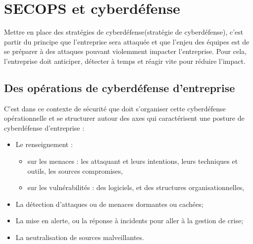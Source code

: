 %
%



\section{SECOPS et cyberdéfense}

Mettre en place des stratégies de cyberdéfense\index(stratégie de cyberdéfense), c'est partir du principe que l'entreprise sera attaquée et que l'enjeu des équipes est de se préparer à des attaques pouvant violemment impacter l'entreprise. Pour cela, l'entreprise doit anticiper, détecter à temps et réagir vite pour réduire l'impact.

	\subsection{Des opérations de cyberdéfense d'entreprise}
	
C'est dans ce contexte de sécurité  que doit s'organiser cette cyberdéfense opérationnelle et se structurer autour des axes qui caractérisent une posture de cyberdéfense d'entreprise : 
	
\begin{itemize}
  \item Le renseignement : 
  				\begin{itemize}
  					\item sur les menaces  : les attaquant et leurs intentions, leurs techniques et outils, les sources compromises,
  					\item sur les vulnérabilités : des logiciels, et des structures organisationnelles,
			\end{itemize}
  \item La détection d'attaques ou de menaces dormantes ou cachées;
  \item La mise en alerte, ou la réponse à incidents pour aller à la gestion de crise;
  \item La neutralisation de sources malveillantes.
\end{itemize}
	
